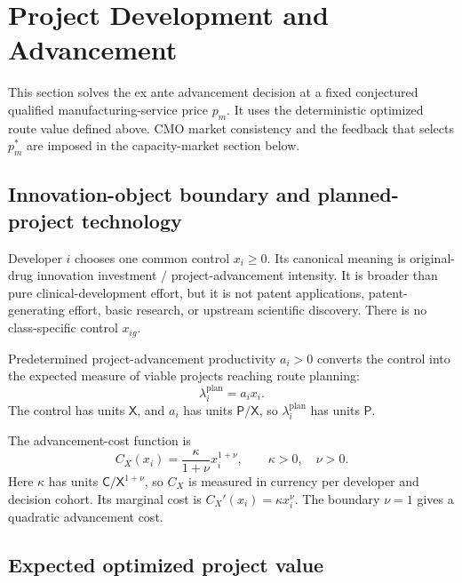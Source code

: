 \section{Project Development and Advancement}
\label{sec:p05-project-advancement}

This section solves the ex ante advancement decision at a fixed conjectured
qualified manufacturing-service price \(p_m\). It uses the deterministic
optimized route value defined above. CMO market consistency and the feedback
that selects \(p_m^*\) are imposed in the capacity-market section below.

\subsection{Innovation-object boundary and planned-project technology}
\label{subsec:p05-technology}

Developer \(i\) chooses one common control \(x_i\geq0\). Its canonical meaning
is original-drug innovation investment / project-advancement intensity. It is
broader than pure clinical-development effort, but it is not patent
applications, patent-generating effort, basic research, or upstream scientific
discovery. There is no class-specific control \(x_{ig}\).

Predetermined project-advancement productivity \(a_i>0\) converts the control
into the expected measure of viable projects reaching route planning:
\begin{equation}
  \lambda_i^{\mathrm{plan}}=a_ix_i.
  \label{eq:p05-planned-intensity}
\end{equation}
The control has units \(\mathsf X\), and \(a_i\) has units
\(\mathsf P/\mathsf X\), so
\(\lambda_i^{\mathrm{plan}}\) has units \(\mathsf P\).

The advancement-cost function is
\begin{equation}
  C_X(x_i)
  =
  \frac{\kappa}{1+\nu}x_i^{1+\nu},
  \qquad
  \kappa>0,\quad \nu>0.
  \label{eq:p05-advancement-cost}
\end{equation}
Here \(\kappa\) has units
\(\mathsf C/\mathsf X^{1+\nu}\), so \(C_X\) is measured in currency
per developer and decision cohort. Its marginal cost is
\(C_X'(x_i)=\kappa x_i^\nu\). The boundary \(\nu=1\) gives a quadratic
advancement cost.

\subsection{Expected optimized project value}
\label{subsec:p05-expected-value}

